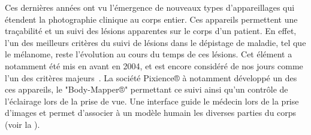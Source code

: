 Ces dernières années ont vu l'émergence de nouveaux types d'appareillages qui étendent la photographie clinique au corps entier. Ces appareils permettent une traçabilité et un suivi des lésions apparentes sur le corps d'un patient. En effet, l'un des meilleurs critères du suivi de lésions dans le dépistage de maladie, tel que le mélanome, reste l'évolution au cours du temps de ces lésions. Cet élément a notamment été mis en avant en 2004, et est encore considéré de nos jours comme l'un des critères majeurs~\cite{Abbasi2004,Glazer2017}. La société Pixience® à notamment développé un des ces appareils, le "Body-Mapper®" permettant ce suivi ainsi qu'un contrôle de l'éclairage lors de la prise de vue. Une interface guide le médecin lors de la prise d'images et permet d'associer à un modèle humain les diverses parties du corps (voir la ).\par

